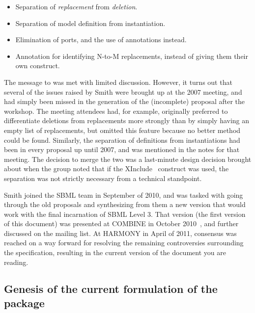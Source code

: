 \begin{itemize}\setlength{\parskip}{0ex}

\item Separation of \emph{replacement} from \emph{deletion}.

\item Separation of model definition from instantiation.

\item Elimination of ports, and the use of annotations instead.

\item Annotation for identifying N-to-M replacements, instead of giving
  them their own construct.

\end{itemize}

The message to 
was met with limited discussion.  However, it turns out that several of
the issues raised by Smith were brought up at the 2007 meeting, and had
simply been missed in the generation of the (incomplete) proposal after
the workshop.  The meeting attendees had, for example, originally
preferred to differentiate deletions from replacements more strongly
than by simply having an empty list of replacements, but omitted this
feature because no better method could be found.  Similarly, the
separation of definitions from instantiations had been in every proposal
up until 2007, and was mentioned in the notes for that meeting.  The
decision to merge the two was a last-minute design decision brought
about when the group noted that if the XInclude~\citep{xinclude}
construct was used, the separation was not strictly necessary from a
technical standpoint.

Smith joined the SBML team in September of 2010, and was tasked with
going through the old proposals and synthesizing from them a new version
that would work with the final incarnation of SBML Level 3.  That
version (the first version of this document) was presented at COMBINE in
October 2010~\citep{smith:2010c}, and further discussed on the
 mailing list.
At HARMONY in April of 2011, consensus was reached on a way forward for
resolving the remaining controversies surrounding the specification,
resulting in the current version of the document you are reading.


\subsection{Genesis of the current formulation of the package}

